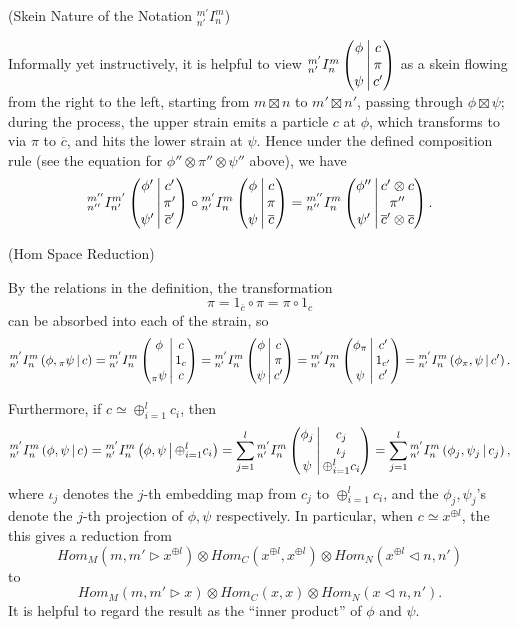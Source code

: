 \begin{remark}\label{remark/skein-nature-of-the-notation-I} (Skein Nature of the Notation ${}^{m'}_{n'}I^{m}_{n}$)

  \noindent Informally yet instructively, it is helpful to view
  ${}^{m'}_{n'} I^{m}_{n} \left( \begin{matrix} \phi \\ {}\\ \psi \end{matrix} \,\middle|\, \begin{matrix} c \\ \pi \\ c' \end{matrix} \right)$ as a skein flowing from the right to
  the left, starting from $m \boxtimes n$ to $m' \boxtimes n'$, passing through $\phi \boxtimes \psi$;
  during the process, the upper strain emits a particle $c$ at $\phi$, which
  transforms to via $\pi$ to $\overline{c}$, and hits the lower strain at
  $\psi$. Hence under the defined composition rule (see the equation for
  $\phi'' \otimes \pi'' \otimes \psi''$ above), we have
  \[
    {}^{m''}_{n''} I^{m'}_{n'} \left( \begin{matrix} \phi' \\ {}\\ \psi' \end{matrix} \,\middle|\, \begin{matrix} c' \\ \pi' \\ \overline{c}' \end{matrix} \right) \circ
    {}^{m'}_{n'} I^{m}_{n} \left( \begin{matrix} \phi \\ {}\\ \psi \end{matrix} \,\middle|\, \begin{matrix} c \\ \pi \\ \overline{c} \end{matrix} \right) =
    {}^{m''}_{n''} I^{m}_{n} \left( \begin{matrix} \phi'' \\ {}\\ \psi' \end{matrix} \,\middle|\, \begin{matrix} c' \otimes c \\ \pi'' \\ \overline{c}' \otimes \overline{c} \end{matrix} \right).
  \]
\end{remark}

\begin{remark}\label{remark/hom-space-reduction} (Hom Space Reduction)

  \noindent By the relations in the definition, the transformation
  \[
    \pi = 1_{\overline{c}} \circ \pi = \pi \circ 1_{c}
  \]
  can be absorbed into each of the strain, so
  \[
    {}^{m'}_{n'} I^{m}_{n} \left( \phi, {}_{\pi}\psi \,\middle|\, c \right) =
    {}^{m'}_{n'} I^{m}_{n} \left( \begin{matrix} \phi \\ {}\\ {}_{\pi}\psi \end{matrix} \,\middle|\, \begin{matrix} c \\ 1_{c} \\ c \end{matrix} \right) =
    {}^{m'}_{n'} I^{m}_{n} \left( \begin{matrix} \phi \\ {}\\ \psi \end{matrix} \,\middle|\, \begin{matrix} c \\ \pi \\ c' \end{matrix} \right) =
    {}^{m'}_{n'} I^{m}_{n} \left( \begin{matrix} \phi_{\pi} \\ {}\\ \psi \end{matrix} \,\middle|\, \begin{matrix} c' \\ 1_{c'} \\ c' \end{matrix} \right) =
    {}^{m'}_{n'} I^{m}_{n} \left( \phi_{\pi}, \psi \,\middle|\, c' \right).
  \]

  \noindent Furthermore, if $c \simeq \oplus_{i=1}^{l} c_{i}$, then
  \[
    {}^{m'}_{n'} I^{m}_{n} \left( \phi, \psi \,\middle|\, c \right) = {}^{m'}_{n'} I^{m}_{n} \left( \phi, \psi \,\middle|\, \oplus_{i=1}^{l} c_{i} \right) = \sum_{j=1}^{l} {}^{m'}_{n'} I^{m}_{n} \left( \begin{matrix} \phi_{j} \\ {}\\ \psi \end{matrix} \,\middle|\, \begin{matrix} c_{j} \\ \iota_{j} \\ \oplus_{i=1}^{l} c_{i} \end{matrix} \right) =
    \sum_{j=1}^{l}{}^{m'}_{n'} I^{m}_{n} \left( \phi_{j}, \psi_{j} \,\middle|\, c_{j} \right),
  \]
  where $\iota_{j}$ denotes the $j$-th embedding map from $c_{j}$ to
  $\oplus_{i=1}^{l}c_{i}$, and the $\phi_{j}, \psi_{j}$'s denote the $j$-th
  projection of $\phi, \psi$ respectively. In particular, when
  $c \simeq x^{\oplus l}$, the this gives a reduction from
  \[
    Hom_{M}(m, m' \rhd x^{\oplus l}) \otimes Hom_{C}(x^{\oplus l}, x^{\oplus l}) \otimes Hom_{N} (x^{\oplus l} \lhd n, n')
  \]
  to
  \[
    Hom_{M}(m, m' \rhd x) \otimes Hom_{C}(x, x) \otimes Hom_{N} (x \lhd n, n').
  \]
  It is helpful to regard the result as the ``inner product'' of $\phi$ and $\psi$.
\end{remark}

